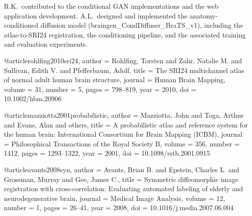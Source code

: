 R.K.\ contributed to the conditional GAN implementations and the web application development.
A.L.\ designed and implemented the anatomy-conditioned diffusion model
(braingen\_CondDiffuser\_BraTS\_v1), including the atlas-to-SRI24 registration, the
conditioning pipeline, and the associated training and evaluation experiments.


@article{rohlfing2010sri24,
  author  = {Rohlfing, Torsten and Zahr, Natalie M. and Sullivan, Edith V. and Pfefferbaum, Adolf},
  title   = {The {SRI24} multichannel atlas of normal adult human brain structure},
  journal = {Human Brain Mapping},
  volume  = {31}, number = {5}, pages = {798--819}, year = {2010},
  doi     = {10.1002/hbm.20906}
}

@article{mazziotta2001probabilistic,
  author  = {Mazziotta, John and Toga, Arthur and Evans, Alan and others},
  title   = {A probabilistic atlas and reference system for the human brain: International Consortium for Brain Mapping ({ICBM})},
  journal = {Philosophical Transactions of the Royal Society B},
  volume  = {356}, number = {1412}, pages = {1293--1322}, year = {2001},
  doi     = {10.1098/rstb.2001.0915}
}

@article{avants2008syn,
  author  = {Avants, Brian B. and Epstein, Charles L. and Grossman, Murray and Gee, James C.},
  title   = {Symmetric diffeomorphic image registration with cross-correlation: Evaluating automated labeling of elderly and neurodegenerative brain},
  journal = {Medical Image Analysis},
  volume  = {12}, number = {1}, pages = {26--41}, year = {2008},
  doi     = {10.1016/j.media.2007.06.004}
}




